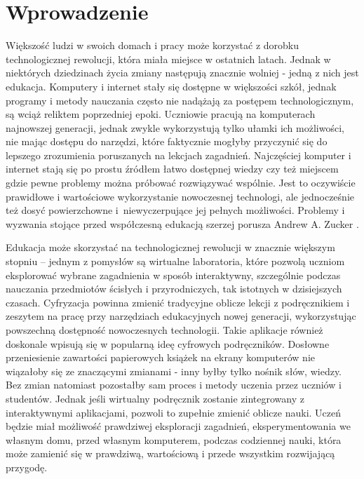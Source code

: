 \chapter{Wprowadzenie}
\label{cha:wprowadzenie}

Większość ludzi w swoich domach i pracy może korzystać z dorobku technologicznej
rewolucji, która miała miejsce w ostatnich latach. Jednak w niektórych
dziedzinach życia zmiany następują znacznie wolniej - jedną z nich jest
edukacja. Komputery i internet stały się dostępne w większości szkół, jednak
programy i metody nauczania często nie nadążają za postępem technologicznym, są
wciąż reliktem poprzedniej epoki. Uczniowie pracują na komputerach najnowszej
generacji, jednak zwykle wykorzystują tylko ułamki ich możliwości, nie mając
dostępu do narzędzi, które faktycznie mogłyby przyczynić się do lepszego
zrozumienia poruszanych na lekcjach zagadnień. Najczęściej komputer i internet
stają się po prostu źródłem łatwo dostępnej wiedzy czy też miejscem gdzie pewne
problemy można próbować rozwiązywać wspólnie. Jest to oczywiście prawidłowe i
wartościowe wykorzystanie nowoczesnej technologi, ale jednocześnie też dosyć
powierzchowne i~niewyczerpujące jej pełnych możliwości. Problemy i wyzwania
stojące przed współczesną edukacją szerzej porusza Andrew A. Zucker
\cite{Zuc2009}.

Edukacja może skorzystać na technologicznej rewolucji w znacznie większym
stopniu -- jednym z pomysłów są wirtualne laboratoria, które pozwolą uczniom
eksplorować wybrane zagadnienia w sposób interaktywny, szczególnie podczas
nauczania przedmiotów ścisłych i przyrodniczych, tak istotnych w dzisiejszych
czasach. Cyfryzacja powinna zmienić tradycyjne oblicze lekcji z podręcznikiem i
zeszytem na pracę przy narzędziach edukacyjnych nowej generacji, wykorzystując
powszechną dostępność nowoczesnych technologii. Takie aplikacje również
doskonale wpisują się w popularną ideę cyfrowych podręczników. Dosłowne
przeniesienie zawartości papierowych książek na ekrany komputerów nie wiązałoby
się ze znaczącymi zmianami - inny byłby tylko nośnik słów, wiedzy. Bez zmian
natomiast pozostałby sam proces i metody uczenia przez uczniów i studentów.
Jednak jeśli wirtualny podręcznik zostanie zintegrowany z interaktywnymi
aplikacjami, pozwoli to zupełnie zmienić oblicze nauki. Uczeń będzie miał
możliwość prawdziwej eksploracji zagadnień, eksperymentowania we własnym domu,
przed własnym komputerem, podczas codziennej nauki, która może zamienić się w
prawdziwą, wartościową i przede wszystkim rozwijającą przygodę.

